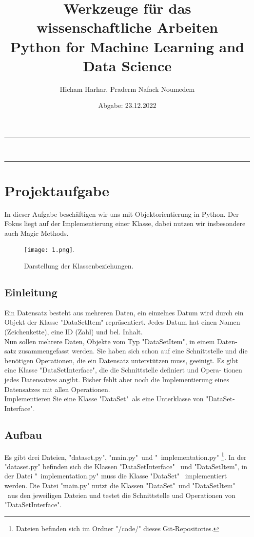 \documentclass{article}
\title{Werkzeuge für das wissenschaftliche Arbeiten \\  {\large Python for Machine Learning and Data Science} }
\author{ {\large Hicham Harhar, Praderm Nafack Noumedem} }
\date{Abgabe: 23.12.2022}
\begin{document}
	
	\maketitle
\hrule\hfill\\	
	
	\tableofcontents
\hrule

	

\section{Projektaufgabe}
	In dieser Aufgabe beschäftigen wir uns mit Objektorientierung in Python. Der
	Fokus liegt auf der Implementierung einer Klasse, dabei nutzen wir insbesondere
	auch Magic Methods.
\begin{figure}[H]
		\begin{minipage}{\linewidth}
			\renewcommand{\footnoterule}{}
			\begin{center}
				\texttt{[image: 1.png]}.
			\end{center}
			\caption[Darstellung der Klassenbeziehungen] {Darstellung der Klassenbeziehungen.}
		\end{minipage}
\end{figure}
\subsection{Einleitung}
Ein Datensatz besteht aus mehreren Daten, ein einzelnes Datum wird durch ein
Objekt der Klasse "DataSetItem" repräsentiert. Jedes Datum hat einen Namen
(Zeichenkette), eine ID (Zahl) und bel. Inhalt.\\[0.3cm]

Nun sollen mehrere Daten, Objekte vom Typ "DataSetItem", in einem Daten-
satz zusammengefasst werden. Sie haben sich schon auf eine Schnittstelle und
die benötigen Operationen, die ein Datensatz unterstützen muss, geeinigt. Es
gibt eine Klasse "DataSetInterface", die die Schnittstelle definiert und Opera-
tionen jedes Datensatzes angibt. Bisher fehlt aber noch die Implementierung
eines Datensatzes mit allen Operationen.\\[0.3cm]

Implementieren Sie eine Klasse "DataSet"\ als eine Unterklasse von "DataSet-
Interface".		
\renewcommand\thefootnote{*}
\subsection{Aufbau}	
Es gibt drei Dateien, "dataset.py", "main.py"\ und "\ implementation.py" \footnote{Dateien befinden sich im Ordner "/code/" dieses Git-Repositories.}. In der
"dataset.py" befinden sich die Klassen "DataSetInterface" \ und "DataSetItem",
in der Datei "\ implementation.py" muss die Klasse "DataSet" \ implementiert
werden. Die Datei "main.py" nutzt die Klassen "DataSet"\ und "DataSetItem" \
aus den jeweiligen Dateien und testet die Schnittstelle und Operationen von
"DataSetInterface".	
\end{document}
